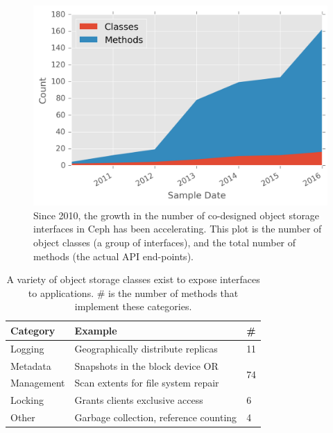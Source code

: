 \documentclass[preprint]{sigplanconf-eurosys}
\begin{document}
\begin{figure}[ht]
\centering
\includegraphics{figures/obj-int-dev-growth.png}
\caption{Since 2010, the growth in the number of co-designed object storage interfaces
in Ceph has been accelerating. This plot is the number of object classes (a
group of interfaces), and the total number of methods (the actual API
end-points).}
\label{fig:obj-int-dev-growth}
\end{figure}

\begin{table}[ht]
\centering
  \begin{tabular}{l|l|l}
    Category & Example & \# \\ \hline
    Logging  & Geographically distribute replicas & 11 \\ \hdashline
    Metadata & Snapshots in the block device OR  & \multirow{2}{*}{74} \\
    Management & Scan extents for file system repair & \\ \hdashline
    Locking  & Grants clients exclusive access & 6 \\ \hdashline
    Other & Garbage collection, reference counting  & 4\\
\end{tabular}
\caption{A variety of object storage classes exist to expose interfaces
    to applications. \# is the number of methods that implement these categories.
}
\label{table:objclasses}
\end{table}
\end{document}
